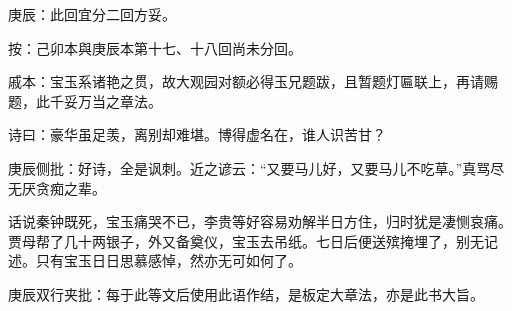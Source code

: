 
\begin{parag}
    \begin{note}庚辰：此回宜分二回方妥。\end{note}\begin{subnote}按：己卯本與庚辰本第十七、十八回尚未分回。\end{subnote}
\end{parag}


\begin{parag}
    \begin{note}戚本：宝玉系诸艳之贯，故大观园对额必得玉兄题跋，且暂题灯匾联上，再请赐题，此千妥万当之章法。\end{note}
\end{parag}


\begin{parag}
    诗曰：豪华虽足羡，离别却难堪。博得虚名在，谁人识苦甘？\begin{note}庚辰侧批：好诗，全是讽刺。近之谚云：“又要马儿好，又要马儿不吃草。”真骂尽无厌贪痴之辈。\end{note}
\end{parag}


\begin{parag}
    话说秦钟既死，宝玉痛哭不已，李贵等好容易劝解半日方住，归时犹是凄恻哀痛。贾母帮了几十两银子，外又备奠仪，宝玉去吊纸。七日后便送殡掩埋了，别无记述。只有宝玉日日思慕感悼，然亦无可如何了。\begin{note}庚辰双行夹批：每于此等文后使用此语作结，是板定大章法，亦是此书大旨。\end{note}
\end{parag}


